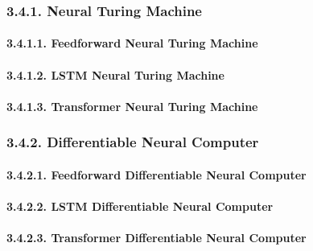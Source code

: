 \documentclass[
]{article}
\begin{document}
\hypertarget{neural-turing-machine}{%
\subsubsection{3.4.1. Neural Turing
Machine}\label{neural-turing-machine}}

\hypertarget{feedforward-neural-turing-machine}{%
\paragraph{3.4.1.1. Feedforward Neural Turing
Machine}\label{feedforward-neural-turing-machine}}

\hypertarget{lstm-neural-turing-machine}{%
\paragraph{3.4.1.2. LSTM Neural Turing
Machine}\label{lstm-neural-turing-machine}}

\hypertarget{transformer-neural-turing-machine}{%
\paragraph{3.4.1.3. Transformer Neural Turing
Machine}\label{transformer-neural-turing-machine}}

\hypertarget{differentiable-neural-computer}{%
\subsubsection{3.4.2. Differentiable Neural
Computer}\label{differentiable-neural-computer}}

\hypertarget{feedforward-differentiable-neural-computer}{%
\paragraph{3.4.2.1. Feedforward Differentiable Neural
Computer}\label{feedforward-differentiable-neural-computer}}

\hypertarget{lstm-differentiable-neural-computer}{%
\paragraph{3.4.2.2. LSTM Differentiable Neural
Computer}\label{lstm-differentiable-neural-computer}}

\hypertarget{transformer-differentiable-neural-computer}{%
\paragraph{3.4.2.3. Transformer Differentiable Neural
Computer}\label{transformer-differentiable-neural-computer}}
\end{document}
